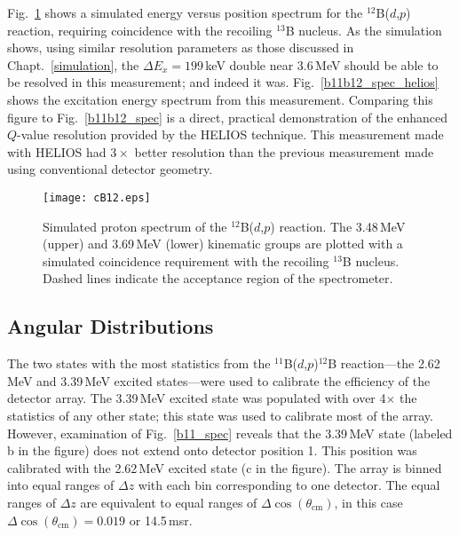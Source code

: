 Fig.~\ref{b12_spec} shows a simulated energy versus position spectrum for the $^{12}$B($d$,$p$) reaction, requiring coincidence with the recoiling $^{13}$B nucleus.  As the simulation shows, using similar resolution parameters as those discussed in Chapt.~\ref{simulation}, the $\Delta E_x=199$\,keV double near 3.6\,MeV should be able to be resolved in this measurement; and indeed it was.  Fig.~\ref{b11b12_spec_helios} shows the excitation energy spectrum from this measurement.  Comparing this figure to Fig.~\ref{b11b12_spec} is a direct, practical demonstration of the enhanced $Q$-value resolution provided by the HELIOS technique.  This measurement made with HELIOS had $3\times$ better resolution than the previous measurement made using conventional detector geometry.

\begin{figure}[t]
\centering
\texttt{[image: cB12.eps]}%
\caption[Simulated proton spectrum of the $^{12}$B($d$,$p$) reaction. ]{Simulated proton spectrum of the $^{12}$B($d$,$p$) reaction.  The 3.48\,MeV (upper) and 3.69\,MeV (lower) kinematic groups are plotted with a simulated coincidence requirement with the recoiling $^{13}$B nucleus.  Dashed lines indicate the acceptance region of the spectrometer.}%
\label{b12_spec}%
\end{figure}

\subsection{Angular Distributions}\label{b12_ang}
The two states with the most statistics from the $^{11}$B($d$,$p$)$^{12}$B reaction---the 2.62\,MeV and 3.39\,MeV excited states---were used to calibrate the efficiency of the detector array.  The 3.39\,MeV excited state was populated with over 4$\times$ the statistics of any other state; this state was used to calibrate most of the array.  However, examination of Fig.~\ref{b11_spec} reveals that the 3.39\,MeV state (labeled b in the figure) does not extend onto detector position 1.  This position was calibrated with the 2.62\,MeV excited state (c in the figure).    The array is binned into equal ranges of $\Delta z$ with each bin corresponding to one detector.  The equal ranges of $\Delta z$ are equivalent to equal ranges of $\Delta \cos(\theta_\mathrm{cm})$, in this case $\Delta \cos(\theta_\mathrm{cm})=0.019$ or 14.5\,msr.%

